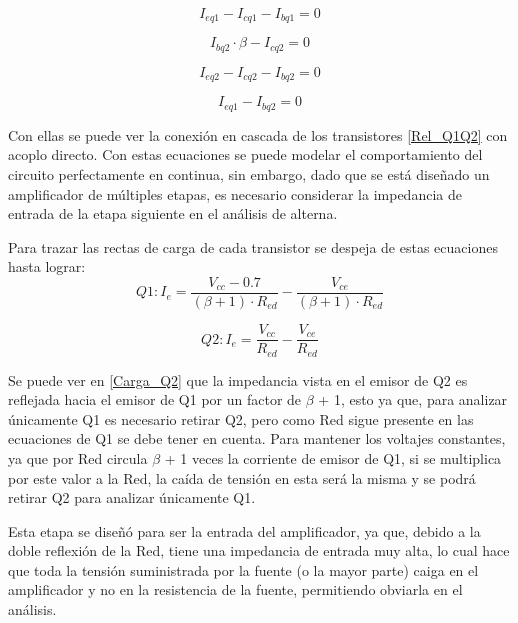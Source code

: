     \begin{equation}
    I_{eq1} - I_{cq1} - I_{bq1} = 0
    \label{Corr_Q1}
    \end{equation}
    
    \begin{equation}
    I_{bq2} \cdot \beta - I_{cq2} = 0
    \label{Gain_Q2}
    \end{equation}
    
    \begin{equation}
    I_{eq2} - I_{cq2} - I_{bq2} = 0
    \label{Corr_Q2}
    \end{equation}
    
    \begin{equation}
    I_{eq1} - I_{bq2} = 0
    \label{Rel_Q1Q2}
    \end{equation}

Con ellas se puede ver la conexión en cascada de los transistores \eqref{Rel_Q1Q2} con acoplo directo. Con estas ecuaciones se puede modelar el comportamiento del circuito perfectamente en continua, sin embargo, dado que se está diseñado un amplificador de múltiples etapas, es necesario considerar la impedancia de entrada de la etapa siguiente en el análisis de alterna.
    
Para trazar las rectas de carga de cada transistor se despeja de estas ecuaciones hasta lograr:
    \begin{equation}
        Q1: I_e = \frac{V_{cc}-0.7}{(\beta+1)\cdot R_{ed}} - \frac{V_{ce}}{(\beta+1) \cdot R_{ed}}
        \label{Carga_Q1}
    \end{equation}
    
    \begin{equation}
        Q2: I_e = \frac{V_{cc}}{R_{ed}} - \frac{V_{ce}}{R_{ed}}
        \label{Carga_Q2}
    \end{equation}

Se puede ver en \eqref{Carga_Q2} que la impedancia vista en el emisor de Q2 es reflejada hacia el emisor de Q1 por un factor de $\beta$ + 1, esto ya que, para analizar únicamente Q1 es necesario retirar Q2, pero como Red sigue presente en las ecuaciones de Q1 se debe tener en cuenta. Para mantener los voltajes constantes, ya que por Red circula $\beta$ + 1 veces la corriente de emisor de Q1, si se multiplica por este valor a la Red, la caída de tensión en esta será la misma y se podrá retirar Q2 para analizar únicamente Q1.

Esta etapa se diseñó para ser la entrada del amplificador, ya que, debido a la doble reflexión de la Red, tiene una impedancia de entrada muy alta, lo cual hace que toda la tensión suministrada por la fuente (o la mayor parte) caiga en el amplificador y no en la resistencia de la fuente, permitiendo obviarla en el análisis.

